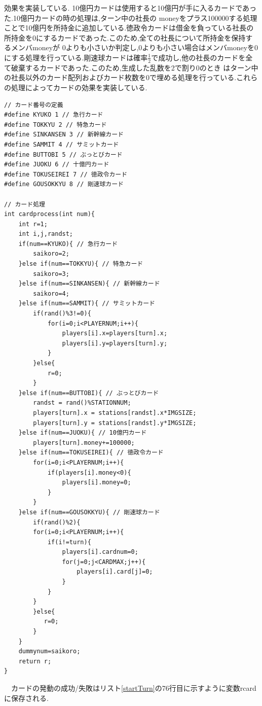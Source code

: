 \documentclass[a4j]{jarticle}
\begin{document}
        効果を実装している. 10億円カードは使用すると10億円が手に入るカードであった.10億円カードの時の処理は,ターン中の社長の
        moneyをプラス100000する処理ことで10億円を所持金に追加している.徳政令カードは借金を負っている社長の所持金を0にするカードであった.このため,全ての社長について所持金を保持するメンバmoneyが
        0よりも小さいか判定し,0よりも小さい場合はメンバmoneyを0にする処理を行っている.剛速球カードは確率$\frac{1}{2}$で成功し,他の社長のカードを全て破棄するカードであった.このため,生成した乱数を2で割り0のとき
        はターン中の社長以外のカード配列およびカード枚数を0で埋める処理を行っている.これらの処理によってカードの効果を実装している.
        \begin{lstlisting}[basicstyle=\ttfamily\footnotesize, frame=single,label=cardprocess,caption=cardprocess関数]
// カード番号の定義
#define KYUKO 1 // 急行カード
#define TOKKYU 2 // 特急カード
#define SINKANSEN 3 // 新幹線カード
#define SAMMIT 4 // サミットカード 
#define BUTTOBI 5 // ぶっとびカード
#define JUOKU 6 // 十億円カード
#define TOKUSEIREI 7 // 徳政令カード
#define GOUSOKKYU 8 // 剛速球カード

// カード処理
int cardprocess(int num){
    int r=1;
    int i,j,randst;
    if(num==KYUKO){ // 急行カード
        saikoro=2;
    }else if(num==TOKKYU){ // 特急カード
        saikoro=3;
    }else if(num==SINKANSEN){ // 新幹線カード
        saikoro=4;
    }else if(num==SAMMIT){ // サミットカード
        if(rand()%3!=0){
            for(i=0;i<PLAYERNUM;i++){
                players[i].x=players[turn].x;
                players[i].y=players[turn].y;
            }
        }else{
            r=0;
        }
    }else if(num==BUTTOBI){ // ぶっとびカード
        randst = rand()%STATIONNUM;
        players[turn].x = stations[randst].x*IMGSIZE;
        players[turn].y = stations[randst].y*IMGSIZE;
    }else if(num==JUOKU){ // 10億円カード
        players[turn].money+=100000;
    }else if(num==TOKUSEIREI){ // 徳政令カード
        for(i=0;i<PLAYERNUM;i++){
            if(players[i].money<0){
                players[i].money=0;
            }
        }
    }else if(num==GOUSOKKYU){ // 剛速球カード
        if(rand()%2){
        for(i=0;i<PLAYERNUM;i++){
            if(i!=turn){
                players[i].cardnum=0;
                for(j=0;j<CARDMAX;j++){
                    players[i].card[j]=0;
                }
            }
        }
        }else{
           r=0; 
        }        
    }
    dummynum=saikoro;
    return r;
}
        \end{lstlisting}   
        　カードの発動の成功/失敗はリスト\ref{startTurn}の76行目に示すように変数rcardに保存される.
\end{document}
